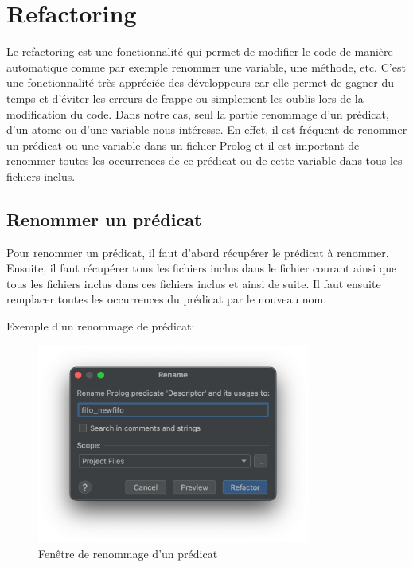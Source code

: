 \section{Refactoring}
\noindent Le refactoring est une fonctionnalité qui permet de modifier le code de manière automatique comme par exemple renommer une variable, une méthode, etc.
C'est une fonctionnalité très appréciée des développeurs car elle permet de gagner du temps et d'éviter les erreurs de frappe ou simplement les oublis lors de la modification du code.
\newdoubleline
Dans notre cas, seul la partie renommage d'un prédicat, d'un atome ou d'une variable nous intéresse.
En effet, il est fréquent de renommer un prédicat ou une variable dans un fichier Prolog et il est important de renommer
toutes les occurrences de ce prédicat ou de cette variable dans tous les fichiers inclus.

\subsection{Renommer un prédicat}
\noindent Pour renommer un prédicat, il faut d'abord récupérer le prédicat à renommer.
Ensuite, il faut récupérer tous les fichiers inclus dans le fichier courant ainsi que tous les fichiers inclus dans ces
fichiers inclus et ainsi de suite.
\newdoubleline
Il faut ensuite remplacer toutes les occurrences du prédicat par le nouveau nom.
\newdoubleline

Exemple d'un renommage de prédicat:

\begin{figure}[H]
    \centering
    \includegraphics[width=0.8\textwidth]{images/Refactor_window.png}
    \caption{Fenêtre de renommage d'un prédicat}
    \label{fig:refactor_window}
\end{figure}

